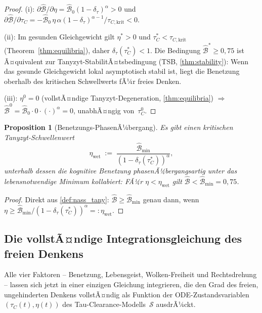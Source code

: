 ﻿\documentclass[12pt,a4paper]{article}
\newtheorem{proposition}[theorem]{Proposition}
\theoremstyle{definition}
\begin{document}
	\begin{proof}
		(i): $\partial\hat{\mathcal{B}}/\partial\eta = \hat{\mathcal{B}}_0(1-\delta_\tau)^\alpha > 0$
		und $\partial\hat{\mathcal{B}}/\partial\tau_C =
		-\hat{\mathcal{B}}_0\,\eta\,\alpha(1-\delta_\tau)^{\alpha-1}/\tau_{C,\mathrm{krit}} < 0$.

		(ii): Im gesunden Gleichgewicht gilt $\eta^* > 0$ und $\tau_C^* < \tau_{C,\mathrm{krit}}$
		(Theorem~\ref{thm:equilibria}), daher $\delta_\tau(\tau_C^*) < 1$.
		Die Bedingung $\hat{\mathcal{B}}^* \geq 0{,}75$ ist Ã¤quivalent zur Tanyzyt-StabilitÃ¤tsbedingung
		(TSB, \cref{thm:stability}): Wenn das gesunde Gleichgewicht lokal asymptotisch stabil ist,
		liegt die Benetzung oberhalb des kritischen Schwellwerts fÃ¼r freies Denken.

		(iii): $\eta^0 = 0$ (vollstÃ¤ndige Tanyzyt-Degeneration, \cref{thm:equilibria})
		$\Rightarrow$ $\hat{\mathcal{B}}^0 = \hat{\mathcal{B}}_0 \cdot 0 \cdot (\cdot)^\alpha = 0$,
		unabhÃ¤ngig von~$\tau_C^0$.
	\end{proof}

	\begin{proposition}[Benetzungs-PhasenÃ¼bergang]
		\label{prop:benet_phase}
		Es gibt einen kritischen Tanyzyt-Schwellenwert
		\[
			\eta_{\mathrm{wet}}
			\;:=\; \frac{\hat{\mathcal{B}}_{\min}}{(1 - \delta_\tau(\tau_C^*))^\alpha},
		\]
		unterhalb dessen die kognitive Benetzung phasenÃ¼bergangsartig unter das lebensnotwendige
		Minimum kollabiert: FÃ¼r $\eta < \eta_{\mathrm{wet}}$ gilt
		$\hat{\mathcal{B}} < \hat{\mathcal{B}}_{\min} = 0{,}75$.
	\end{proposition}

	\begin{proof}
		Direkt aus \cref{def:nass_tany}: $\hat{\mathcal{B}} \geq \hat{\mathcal{B}}_{\min}$
		genau dann, wenn
		$\eta \geq \hat{\mathcal{B}}_{\min}/(1-\delta_\tau(\tau_C^*))^\alpha =: \eta_{\mathrm{wet}}$.
	\end{proof}

	\subsection{Die vollstÃ¤ndige Integrationsgleichung des freien Denkens}

	Alle vier Faktoren -- Benetzung, Lebensgeist, Wolken-Freiheit und Rechtsdrehung --
	lassen sich jetzt in einer einzigen Gleichung integrieren, die den Grad des freien,
	ungehinderten Denkens vollstÃ¤ndig als Funktion der ODE-Zustandsvariablen
	$(\tau_C(t), \eta(t))$ des Tau-Clearance-Modells~$\mathcal{S}$ ausdrÃ¼ckt.
\end{document}

